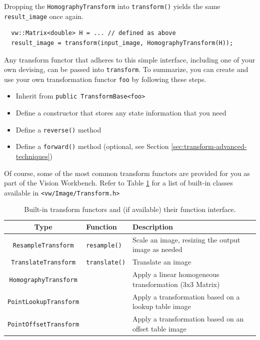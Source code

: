 Dropping the \verb#HomographyTransform# into \verb#transform()# yields
the same \verb#result_image# once again.

\begin{verbatim} 
  vw::Matrix<double> H = ... // defined as above
  result_image = transform(input_image, HomographyTransform(H));
\end{verbatim}

Any transform functor that adheres to this simple interface, including
one of your own devising, can be passed into \verb#transform#.  To
summarize, you can create and use your own transformation functor
\verb#foo# by following these steps.
\begin{itemize}
\item Inherit from \verb#public TransformBase<foo>#
\item Define a constructor that stores any state information that you need
\item Define a \verb#reverse()# method 
\item Define a \verb#forward()# method (optional, see Section \ref{sec:transform-advanced-techniques})
\end{itemize}

Of course, some of the most common transform functors are provided for
you as part of the Vision Workbench.  Refer to Table
\ref{tbl:transform-functors} for a list of built-in classes available
in \verb#<vw/Image/Transform.h>#

\begin{table}[tbh]\begin{centering}
\begin{tabular}{|c|l|l|} \hline
Type & Function & Description \\ \hline \hline
\verb#ResampleTransform# & \verb#resample()# & Scale an image, resizing the output image as needed \\ \hline
\verb#TranslateTransform# & \verb#translate()# & Translate an image \\ \hline
\verb#HomographyTransform# & & Apply a linear homogeneous transformation (3x3 Matrix)  \\ \hline
\verb#PointLookupTransform# & & Apply a transformation based on a lookup table image  \\ \hline
\verb#PointOffsetTransform# & & Apply a transformation based on an offset table image \\ \hline
\end{tabular}
\caption{Built-in transform functors and (if available) their function interface.}
\label{tbl:transform-functors}
\end{centering}\end{table}

